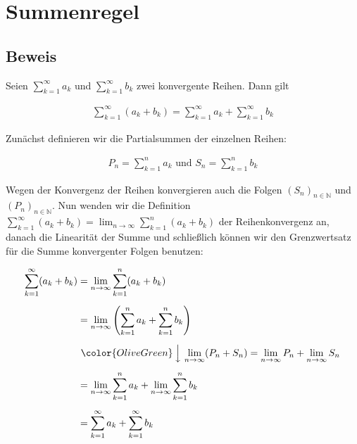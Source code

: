 \documentclass[fontsize=9pt,
               parskip=half-,
               DIV=14,
               listof=chapterentry,
               tocflat]{scrbook}
\begin{document}
\section{Summenregel}

\subsection{Beweis}

\begin{theorem*}
Seien $\sum _{k=1}^{\infty }a_{k}$ und $\sum _{k=1}^{\infty }b_{k}$ zwei konvergente Reihen. Dann gilt

\begin{align*}
\sum _{k=1}^{\infty }(a_{k}+b_{k})=\sum _{k=1}^{\infty }a_{k}+\sum _{k=1}^{\infty }b_{k}
\end{align*}

\end{theorem*}

\begin{proof*}
Zunächst definieren wir die Partialsummen der einzelnen Reihen:

\begin{align*}
P_{n}=\sum _{k=1}^{n}a_{k}{\text{ und }}S_{n}=\sum _{k=1}^{n}b_{k}
\end{align*}

Wegen der Konvergenz der Reihen konvergieren auch die Folgen $(S_{n})_{n\in \mathbb {N} }$ und $(P_{n})_{n\in \mathbb {N} }$. Nun wenden wir die Definition $\sum _{k=1}^{\infty }(a_{k}+b_{k})=\lim _{n\to \infty }\sum _{k=1}^{n}(a_{k}+b_{k})$ der Reihenkonvergenz an, danach die Linearität der Summe und schließlich können wir den Grenzwertsatz für die Summe konvergenter Folgen benutzen:

\begin{align*}
\sum _{k=1}^{\infty }(a_{k}+b_{k})&=\lim _{n\to \infty }\sum _{k=1}^{n}(a_{k}+b_{k})\\[0.5em]&=\lim _{n\to \infty }\left(\sum _{k=1}^{n}a_{k}+\sum _{k=1}^{n}b_{k}\right)\\[0.5em]&\ {\color {OliveGreen}\left\downarrow \ \lim _{n\to \infty }(P_{n}+S_{n})=\lim _{n\to \infty }P_{n}+\lim _{n\to \infty }S_{n}\right.}\\[0.5em]&=\lim _{n\to \infty }\sum _{k=1}^{n}a_{k}+\lim _{n\to \infty }\sum _{k=1}^{n}b_{k}\\[0.5em]&=\sum _{k=1}^{\infty }a_{k}+\sum _{k=1}^{\infty }b_{k}
\end{align*}

\end{proof*}
\end{document}
